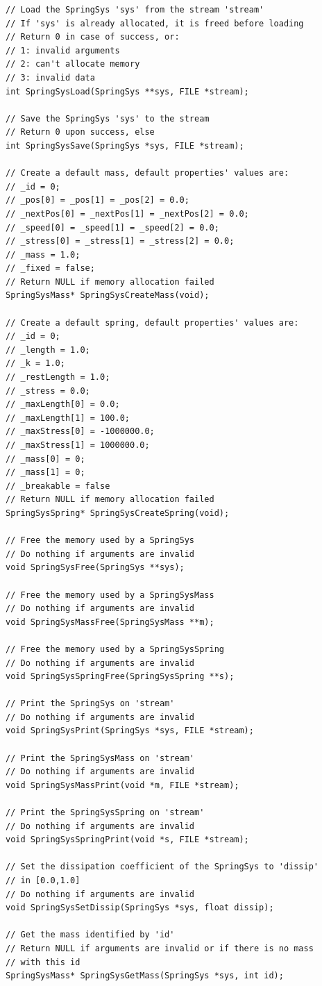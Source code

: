 \documentclass[12pt, a4paper]{article}
\begin{document}
\begin{scriptsize}
\begin{ttfamily}
\begin{lstlisting}
// Load the SpringSys 'sys' from the stream 'stream'
// If 'sys' is already allocated, it is freed before loading
// Return 0 in case of success, or:
// 1: invalid arguments
// 2: can't allocate memory
// 3: invalid data
int SpringSysLoad(SpringSys **sys, FILE *stream);

// Save the SpringSys 'sys' to the stream
// Return 0 upon success, else
int SpringSysSave(SpringSys *sys, FILE *stream);

// Create a default mass, default properties' values are:
// _id = 0;
// _pos[0] = _pos[1] = _pos[2] = 0.0;
// _nextPos[0] = _nextPos[1] = _nextPos[2] = 0.0;
// _speed[0] = _speed[1] = _speed[2] = 0.0;
// _stress[0] = _stress[1] = _stress[2] = 0.0;
// _mass = 1.0;
// _fixed = false;
// Return NULL if memory allocation failed
SpringSysMass* SpringSysCreateMass(void);

// Create a default spring, default properties' values are:
// _id = 0;
// _length = 1.0;
// _k = 1.0;
// _restLength = 1.0;
// _stress = 0.0;
// _maxLength[0] = 0.0;
// _maxLength[1] = 100.0;
// _maxStress[0] = -1000000.0;
// _maxStress[1] = 1000000.0;
// _mass[0] = 0;
// _mass[1] = 0;
// _breakable = false
// Return NULL if memory allocation failed
SpringSysSpring* SpringSysCreateSpring(void);

// Free the memory used by a SpringSys
// Do nothing if arguments are invalid
void SpringSysFree(SpringSys **sys);

// Free the memory used by a SpringSysMass
// Do nothing if arguments are invalid
void SpringSysMassFree(SpringSysMass **m);

// Free the memory used by a SpringSysSpring
// Do nothing if arguments are invalid
void SpringSysSpringFree(SpringSysSpring **s);

// Print the SpringSys on 'stream'
// Do nothing if arguments are invalid
void SpringSysPrint(SpringSys *sys, FILE *stream);

// Print the SpringSysMass on 'stream'
// Do nothing if arguments are invalid
void SpringSysMassPrint(void *m, FILE *stream);

// Print the SpringSysSpring on 'stream'
// Do nothing if arguments are invalid
void SpringSysSpringPrint(void *s, FILE *stream);

// Set the dissipation coefficient of the SpringSys to 'dissip' 
// in [0.0,1.0]
// Do nothing if arguments are invalid
void SpringSysSetDissip(SpringSys *sys, float dissip);

// Get the mass identified by 'id'
// Return NULL if arguments are invalid or if there is no mass 
// with this id
SpringSysMass* SpringSysGetMass(SpringSys *sys, int id);


\end{lstlisting}
\end{ttfamily}
\end{scriptsize}
\end{document}
